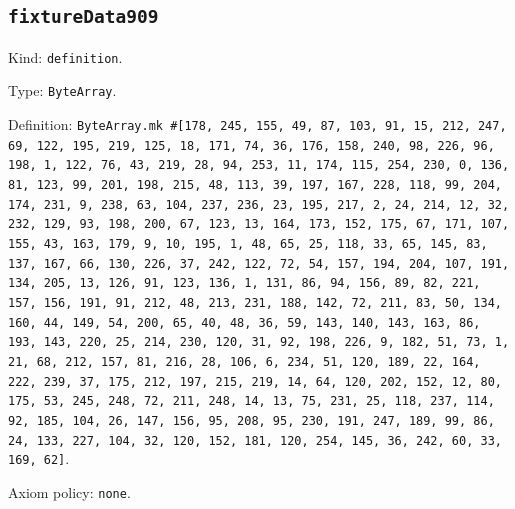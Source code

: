 \documentclass[11pt]{article}
\begin{document}
\subsection*{\texttt{fixtureData909}}
\noindent Kind: \texttt{definition}.\par
\noindent Type: \texttt{ByteArray}.\par
\noindent Definition: \texttt{ByteArray.mk \#[178, 245, 155, 49, 87, 103, 91, 15, 212, 247, 69, 122, 195, 219, 125, 18, 171, 74, 36, 176, 158, 240, 98, 226, 96, 198, 1, 122, 76, 43, 219, 28, 94, 253, 11, 174, 115, 254, 230, 0, 136, 81, 123, 99, 201, 198, 215, 48, 113, 39, 197, 167, 228, 118, 99, 204, 174, 231, 9, 238, 63, 104, 237, 236, 23, 195, 217, 2, 24, 214, 12, 32, 232, 129, 93, 198, 200, 67, 123, 13, 164, 173, 152, 175, 67, 171, 107, 155, 43, 163, 179, 9, 10, 195, 1, 48, 65, 25, 118, 33, 65, 145, 83, 137, 167, 66, 130, 226, 37, 242, 122, 72, 54, 157, 194, 204, 107, 191, 134, 205, 13, 126, 91, 123, 136, 1, 131, 86, 94, 156, 89, 82, 221, 157, 156, 191, 91, 212, 48, 213, 231, 188, 142, 72, 211, 83, 50, 134, 160, 44, 149, 54, 200, 65, 40, 48, 36, 59, 143, 140, 143, 163, 86, 193, 143, 220, 25, 214, 230, 120, 31, 92, 198, 226, 9, 182, 51, 73, 1, 21, 68, 212, 157, 81, 216, 28, 106, 6, 234, 51, 120, 189, 22, 164, 222, 239, 37, 175, 212, 197, 215, 219, 14, 64, 120, 202, 152, 12, 80, 175, 53, 245, 248, 72, 211, 248, 14, 13, 75, 231, 25, 118, 237, 114, 92, 185, 104, 26, 147, 156, 95, 208, 95, 230, 191, 247, 189, 99, 86, 24, 133, 227, 104, 32, 120, 152, 181, 120, 254, 145, 36, 242, 60, 33, 169, 62]}.\par
\noindent Axiom policy: \texttt{none}.\par
\end{document}

